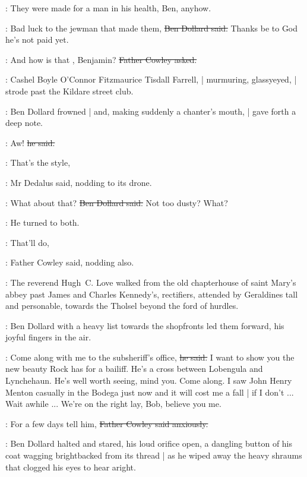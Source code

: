 \simon:
They were made for a man in his health, Ben, anyhow.

\dollard:
Bad luck to the jewman that made them,
\sout{Ben Dollard said.}
Thanks be to God he's not paid yet.

\cowley:
And how is that , Benjamin?
\sout{Father Cowley asked.}

\begin{mdframed}
    :
    Cashel Boyle O'Connor Fitzmaurice Tisdall Farrell, |
    murmuring, glassyeyed, |
    strode past the Kildare street club.
\end{mdframed}

:
Ben Dollard frowned |
and, making suddenly a chanter's mouth, |
gave forth a deep note.

\dollard:
Aw!
\sout{he said.}

\simon:
That's the style,

:
Mr Dedalus said,
nodding to its drone.

\dollard:
What about that?
\sout{Ben Dollard said.}
Not too dusty?
What?

:
He turned to both.

\cowley:
That'll do,

:
Father Cowley said,
nodding also.

\begin{mdframed}
    :
    The reverend Hugh~C. Love
    walked from the old chapterhouse of saint Mary's abbey
    past James and Charles Kennedy's, rectifiers,
    attended by Geraldines tall and personable,
    towards the Tholsel beyond the ford of hurdles.
\end{mdframed}

:
Ben Dollard with a heavy list towards the shopfronts
led them forward,
his joyful fingers in the air.

\dollard:
Come along with me to the subsheriff's office,
\sout{he said.}
I want to show you the new beauty Rock has for a bailiff.
He's a cross between Lobengula and Lynchehaun.
He's well worth seeing, mind you.
Come along.
I saw John Henry Menton casually in the Bodega just now
and it will cost me a fall |
if I don't ...
Wait awhile ...
We're on the right lay, Bob, believe you me.

\cowley:
For a few days tell him,
\sout{Father Cowley said anxiously.}

:
Ben Dollard halted and stared,
his loud orifice open,
a dangling button of his coat wagging brightbacked from its thread |
as he wiped away the heavy shraums that clogged his eyes
to hear aright.

